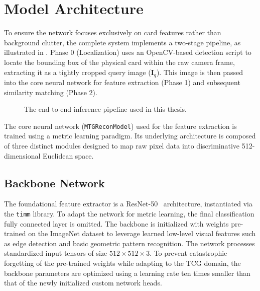 \section{Model Architecture}\label{sec:model_architecture}
To ensure the network focuses exclusively on card features rather than background clutter, the complete system implements a two-stage pipeline, as illustrated in . Phase 0 (Localization) uses an OpenCV-based detection script to locate the bounding box of the physical card within the raw camera frame, extracting it as a tightly cropped query image ($\mathbf{I}_q$). This image is then passed into the core neural network for feature extraction (Phase 1) and subsequent similarity matching (Phase 2).
\begin{figure}[H]
    \centering
    \resizebox{\textwidth}{!}{}
    \caption{The end-to-end inference pipeline used in this thesis.}
    \label{fig:pipeline_flow}
\end{figure}
The core neural network (\texttt{MTGReconModel}) used for the feature extraction is trained using a metric learning paradigm. Its underlying architecture is composed of three distinct modules designed to map raw pixel data into discriminative 512-dimensional Euclidean space.

\subsection{Backbone Network}\label{sub:backbone}
The foundational feature extractor is a \ac{ResNet}-50~\cite{he2015resnet} architecture, instantiated via the \texttt{timm} library. To adapt the network for metric learning, the final classification fully connected layer is omitted. The backbone is initialized with weights pre-trained on the ImageNet dataset to leverage learned low-level visual features such as edge detection and basic geometric pattern recognition. The network processes standardized input tensors of size $512 \times 512 \times 3$. To prevent catastrophic forgetting of the pre-trained weights while adapting to the \ac{TCG} domain, the backbone parameters are optimized using a learning rate ten times smaller than that of the newly initialized custom network heads.

